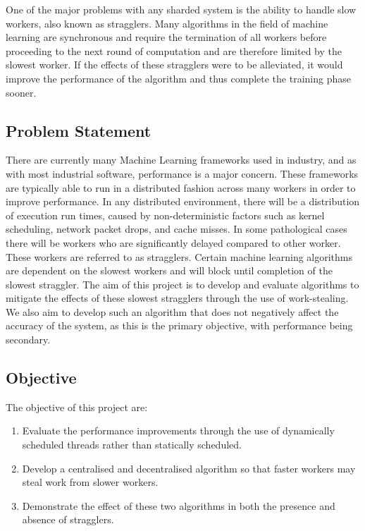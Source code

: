 \documentclass[12pt]{article}
\begin{document}
\newline
\newline
One of the major problems with any sharded system is the ability to handle slow workers, also known as stragglers. Many algorithms in the field of machine learning are synchronous and require the termination of all workers before proceeding to the next round of computation and are therefore limited by the slowest worker. If the effects of these stragglers were to be alleviated, it would improve the performance of the algorithm and thus complete the training phase sooner.  

\newpage

\subsection{Problem Statement}
There are currently many Machine Learning frameworks used in industry, and as with most industrial software, performance is a major concern. These frameworks are typically able to run in a distributed fashion across many workers in order to improve performance. In any distributed environment, there will be a distribution of execution run times, caused by non-deterministic factors such as kernel scheduling, network packet drops, and cache misses. In some pathological cases there will be workers who are significantly delayed compared to other worker. These workers are referred to as stragglers. Certain machine learning algorithms are dependent on the slowest workers and will block until completion of the slowest straggler. 
\newline
The aim of this project is to develop and evaluate algorithms to mitigate the effects of these slowest stragglers through the use of work-stealing. We also aim to develop such an algorithm that does not negatively affect the accuracy of the system, as this is the primary objective, with performance being secondary.

\newpage

\subsection{Objective}
The objective of this project are:

\begin{enumerate}
\item Evaluate the performance improvements through the use of dynamically scheduled threads rather than statically scheduled.
\item Develop a centralised and decentralised algorithm so that faster workers may steal work from slower workers.
\item Demonstrate the effect of these two algorithms in both the presence and absence of stragglers.
\end{enumerate}
\end{document}
